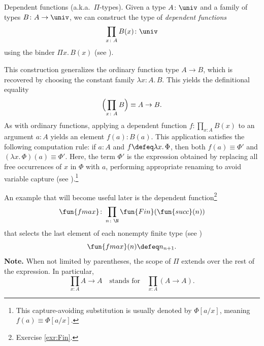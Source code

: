 \begin{lpar}{Dependent functions \textrm{(a.k.a.~$\Pi$-types)}.} \label{lpar:Pi-types}
    Given a type $A\colon\univ$ and a family of types $B\colon A\to\univ$, we can construct the type of \textsl{dependent functions}
    \[
        \prod_{x\colon A}B(x)\colon\univ
    \]
    using the binder $\Pi x.\,B(x)$ (see ).
    
    This construction generalizes the ordinary function type $A\to B$, which is recovered by choosing the constant family $\lambda x\colon A.\,B$. This yields the definitional equality
    \begin{equation}\label{eq:function=independent-dependent-function}
        \Bigl(\prod_{x\colon A}B\Bigr)\equiv A\to B.
    \end{equation}
    As with ordinary functions, applying a dependent function $f\colon\prod_{x\colon A}B(x)$ to an argument $a\colon A$ yields an element $f(a)\colon B(a)$. This application satisfies the following computation rule: if $a\colon A$ and $f\defeq\lambda x.\,\Phi$, then both $f(a)\equiv\Phi'$ and $(\lambda x.\,\Phi)(a)\equiv\Phi'$. Here, the term $\Phi'$ is the expression obtained by replacing all free occurrences of $x$ in $\Phi$ with $a$, performing appropriate renaming to avoid variable capture (see ).\footnote{This capture-avoiding substitution is usually denoted by $\Phi[a/x]$, meaning $f(a)\equiv\Phi[a/x]$.}

    An example that will become useful later is the dependent function\footnote{Exercise \ref{exr:Fin}.}
    \[
        \fun{fmax}\colon\prod_{n\colon\N}\fun{Fin}(\fun{succ}(n))
    \]
    that selects the last element of each nonempty finite type (see )
    \[
        \fun{fmax}(n)\defeq n_{n+1}.
    \]
    \textbf{Note.} When not limited by parentheses, the scope of $\Pi$ extends over the rest of the expression. In particular,
    \[
        \prod_{x\colon A}A\to A\quad\text{stands for}\quad\prod_{x\colon A}(A\to A).
    \]
\end{lpar}

